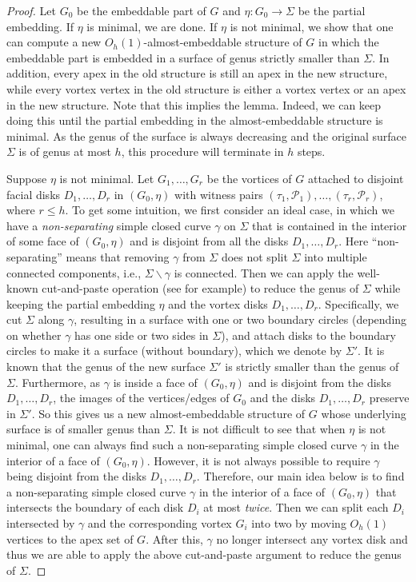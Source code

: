 \documentclass[a4paper,11pt]{article}
\numberwithin{lemma}{section}
\begin{document}
\begin{proof}
Let $G_0$ be the embeddable part of $G$ and $\eta\colon G_0 \rightarrow \varSigma$ be the partial embedding.
If $\eta$ is minimal, we are done.
If $\eta$ is not minimal, we show that one can compute a new $O_h(1)$-almost-embeddable structure of $G$ in which the embeddable part is embedded in a surface of genus strictly smaller than $\varSigma$.
In addition, every apex in the old structure is still an apex in the new structure, while every vortex vertex in the old structure is either a vortex vertex or an apex in the new structure.
Note that this implies the lemma.
Indeed, we can keep doing this until the partial embedding in the almost-embeddable structure is minimal.
As the genus of the surface is always decreasing and the original surface $\varSigma$ is of genus at most $h$, this procedure will terminate in $h$ steps.

Suppose $\eta$ is not minimal.
Let $G_1,\dots,G_r$ be the vortices of $G$ attached to disjoint facial disks $D_1,\dots,D_r$ in $(G_0,\eta)$ with witness pairs $(\tau_1,\mathcal{P}_1),\dots,(\tau_r,\mathcal{P}_r)$, where $r \leq h$.
To get some intuition, we first consider an ideal case, in which we have a \emph{non-separating} simple closed curve $\gamma$ on $\varSigma$ that is contained in the interior of some face of $(G_0,\eta)$ and is disjoint from all the disks $D_1,\dots,D_r$.
Here ``non-separating'' means that removing $\gamma$ from $\varSigma$ does not split $\varSigma$ into multiple connected components, i.e., $\varSigma \backslash \gamma$ is connected.
Then we can apply the well-known cut-and-paste operation (see \cite{Diestel05} for example) to reduce the genus of $\varSigma$ while keeping the partial embedding $\eta$ and the vortex disks $D_1,\dots,D_r$.
Specifically, we cut $\varSigma$ along $\gamma$, resulting in a surface with one or two boundary circles (depending on whether $\gamma$ has one side or two sides in $\varSigma$), and attach disks to the boundary circles to make it a surface (without boundary), which we denote by $\varSigma'$.
It is known that the genus of the new surface $\varSigma'$ is strictly smaller than the genus of $\varSigma$.
Furthermore, as $\gamma$ is inside a face of $(G_0,\eta)$ and is disjoint from the disks $D_1,\dots,D_r$, the images of the vertices/edges of $G_0$ and the disks $D_1,\dots,D_r$ preserve in $\varSigma'$.
So this gives us a new almost-embeddable structure of $G$ whose underlying surface is of smaller genus than $\varSigma$.
It is not difficult to see that when $\eta$ is not minimal, one can always find such a non-separating simple closed curve $\gamma$ in the interior of a face of $(G_0,\eta)$.
However, it is not always possible to require $\gamma$ being disjoint from the disks $D_1,\dots,D_r$.
Therefore, our main idea below is to find a non-separating simple closed curve $\gamma$ in the interior of a face of $(G_0,\eta)$ that intersects the boundary of each disk $D_i$ at most \emph{twice}.
Then we can split each $D_i$ intersected by $\gamma$ and the corresponding vortex $G_i$ into two by moving $O_h(1)$ vertices to the apex set of $G$.
After this, $\gamma$ no longer intersect any vortex disk and thus we are able to apply the above cut-and-paste argument to reduce the genus of $\varSigma$.


\end{proof}
\end{document}
